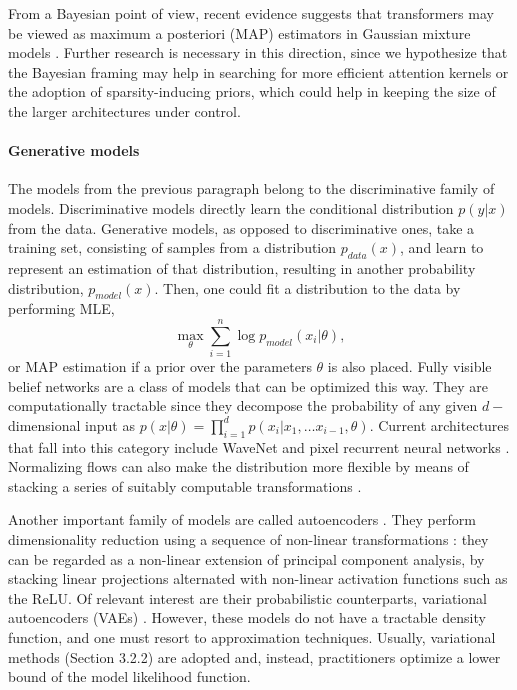From a Bayesian point of view, recent evidence suggests that transformers may be viewed as maximum 
a posteriori (MAP) estimators in 
 Gaussian mixture models \parencite{movellan2020probabilistic}. Further research is necessary in this direction, since we hypothesize that the Bayesian framing may help in searching for more efficient attention kernels or the adoption of sparsity-inducing priors, which could help in keeping the size of the larger architectures under control.


\paragraph{Generative models} 
The models from the previous paragraph belong to the discriminative family of models. Discriminative models directly learn the conditional distribution $p(y|x)$ from the data.
Generative models, as opposed to discriminative ones, take a training set, consisting of samples from a distribution $p_{data}(x)$, and learn to represent an estimation of that distribution, resulting in another probability distribution, $p_{model}(x)$. Then, one could fit a distribution to the data by performing MLE,
$$
\max_{\theta} \sum_{i=1}^n \log p_{model} (x_i | \theta),
$$
or MAP estimation if a prior over the parameters $\theta$ is also placed. Fully visible belief networks \parencite{10.5555/2998828.2998922} are a class of models that can be optimized this way. They are computationally tractable since they decompose the probability of any given $d-$dimensional input as $p(x | \theta) = \prod_{i=1}^d p(x_i | x_1 , \ldots x_{i-1}, \theta)$. Current architectures that fall into this category include WaveNet \parencite{oord2016wavenet} and pixel recurrent neural networks \parencite{pmlr-v48-oord16}. Normalizing flows can also make the distribution more flexible by means of stacking a series of suitably computable transformations \parencite{pmlr-v37-rezende15}.

Another important family of models are called autoencoders \parencite{autoencoders}. They perform dimensionality reduction 
using a sequence of non-linear transformations \parencite{baldi2012autoencoders}: they can be regarded as a non-linear extension of principal component analysis, by stacking linear projections alternated with non-linear activation functions such as the ReLU. 
Of relevant interest are their probabilistic counterparts, variational autoencoders (VAEs) \parencite{kingma2013auto}. However, these models do not have a tractable density function, and one must resort to approximation techniques. Usually, variational methods (Section 3.2.2) are adopted and, instead, practitioners optimize a lower bound of the model likelihood function.

